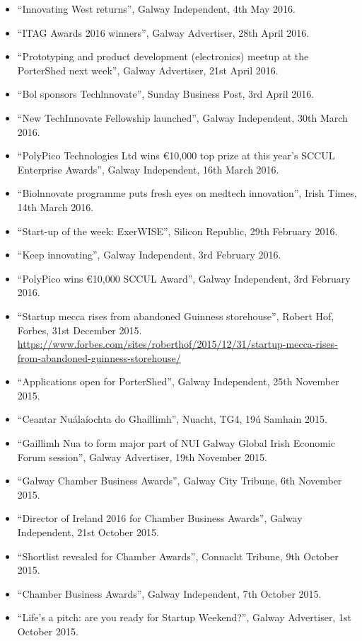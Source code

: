 \documentclass[10pt,a4paper]{res} %
\begin{document}
\begin{resume}
{\begin{itemize}
\item ``Innovating West returns'', Galway Independent, 4th May 2016.
\item ``ITAG Awards 2016 winners'', Galway Advertiser, 28th April 2016.
\item ``Prototyping and product development (electronics) meetup at the PorterShed next week'', Galway Advertiser, 21st April 2016.
\item ``Bol sponsors Techlnnovate'', Sunday Business Post, 3rd April 2016.
\item ``New TechInnovate Fellowship launched'', Galway Independent, 30th March 2016.
\item ``PolyPico Technologies Ltd wins \euro{}10,000 top prize at this year's SCCUL Enterprise Awards'', Galway Independent, 16th March 2016.
\item ``Biolnnovate programme puts fresh eyes on medtech innovation'', Irish Times, 14th March 2016.
\item ``Start-up of the week: ExerWISE'', Silicon Republic, 29th February 2016.
\item ``Keep innovating'', Galway Independent, 3rd February 2016.
\item ``PolyPico wins \euro{}10,000 SCCUL Award'', Galway Independent, 3rd February 2016.
\item ``Startup mecca rises from abandoned Guinness storehouse'', Robert Hof, Forbes, 31st December 2015. \url{https://www.forbes.com/sites/roberthof/2015/12/31/startup-mecca-rises-from-abandoned-guinness-storehouse/}
\item ``Applications open for PorterShed'', Galway Independent, 25th November 2015.
\item ``Ceantar Nu\'{a}la\'{i}ochta do Ghaillimh'', Nuacht, TG4, 19\'{u} Samhain 2015.
\item ``Gaillimh Nua to form major part of NUI Galway Global Irish Economic Forum session'', Galway Advertiser, 19th November 2015.
\item ``Galway Chamber Business Awards'', Galway City Tribune, 6th November 2015.
\item ``Director of Ireland 2016 for Chamber Business Awards'', Galway Independent, 21st October 2015.
\item ``Shortlist revealed for Chamber Awards'', Connacht Tribune, 9th October 2015.
\item ``Chamber Business Awards'', Galway Independent, 7th October 2015.
\item ``Life's a pitch: are you ready for Startup Weekend?'', Galway Advertiser, 1st October 2015.

\end{itemize}}
\end{resume}
\end{document}
